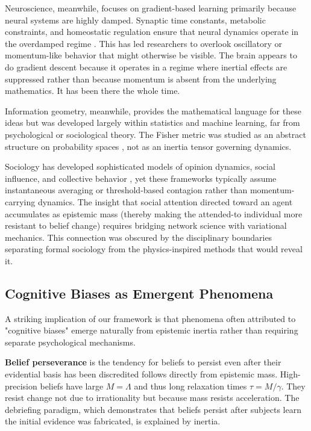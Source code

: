 \documentclass[12pt]{article}
\begin{document}
Neuroscience, meanwhile, focuses on gradient-based learning primarily because neural systems are highly damped. Synaptic time constants, metabolic constraints, and homeostatic regulation ensure that neural dynamics operate in the overdamped regime \citet{friston2008hierarchical} \citet{bogacz2017tutorial}. This has led researchers to overlook oscillatory or momentum-like behavior that might otherwise be visible. The brain appears to do gradient descent because it operates in a regime where inertial effects are suppressed rather than because momentum is absent from the underlying mathematics. It has been there the whole time.

Information geometry, meanwhile, provides the mathematical language for these ideas but was developed largely within statistics and machine learning, far from psychological or sociological theory. The Fisher metric was studied as an abstract structure on probability spaces \citet{Amari2016}, not as an inertia tensor governing dynamics.

 
Sociology has developed sophisticated models of opinion dynamics, social influence, and collective behavior \citet{degroot1974, friedkin2011, flache2017}, yet these frameworks typically assume instantaneous averaging or threshold-based contagion rather than momentum-carrying dynamics. The insight that social attention directed toward an agent accumulates as epistemic mass (thereby making the attended-to individual more resistant to belief change) requires bridging network science with variational mechanics. This connection was obscured by the disciplinary boundaries separating formal sociology from the physics-inspired methods that would reveal it.

\subsection{Cognitive Biases as Emergent Phenomena}

A striking implication of our framework is that phenomena often attributed to "cognitive biases" emerge naturally from epistemic inertia rather than requiring separate psychological mechanisms.

\textbf{Belief perseverance} is the tendency for beliefs to persist even after their evidential basis has been discredited \citet{anderson1980, ross1975} follows directly from epistemic mass. High-precision beliefs have large $M = \Lambda$ and thus long relaxation times $\tau = M/\gamma$. They resist change not due to irrationality but because mass resists acceleration. The debriefing paradigm, which demonstrates that beliefs persist after subjects learn the initial evidence was fabricated, is explained by inertia. 
\end{document}
